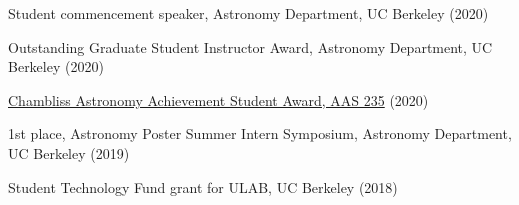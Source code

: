 

\item[{\color{numcolor}\scriptsize5}] Student commencement speaker, Astronomy Department, UC Berkeley (2020)

\item[{\color{numcolor}\scriptsize4}] Outstanding Graduate Student Instructor Award, Astronomy Department, UC Berkeley (2020)

\item[{\color{numcolor}\scriptsize3}] \href{https://aas.org/grants-and-prizes/chambliss-astronomy-achievement-student-awards}{Chambliss Astronomy Achievement Student Award, AAS 235} (2020)

\item[{\color{numcolor}\scriptsize2}] 1st place, Astronomy Poster Summer Intern Symposium, Astronomy Department, UC Berkeley (2019)

\item[{\color{numcolor}\scriptsize1}] Student Technology Fund grant for ULAB, UC Berkeley (2018)

